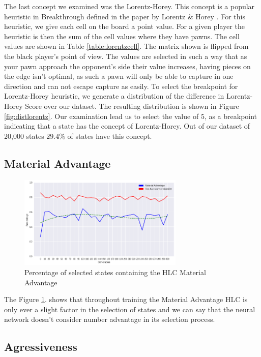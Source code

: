 The last concept we examined was the Lorentz-Horey. This concept is a popular heuristic in Breakthrough defined in the paper by Lorentz \& Horey \cite{lorentz:heuristic}. For this heuristic, we give each cell on the board a point value. For a given player the heuristic is then the sum of the cell values where they have pawns. The cell values are shown in Table \ref{table:lorentzcell}. The matrix shown is flipped from the black player's point of view. The values are selected in such a way that as your pawn approach the opponent's side their value increases, having pieces on the edge isn't optimal, as such a pawn will only be able to capture in one direction and can not escape capture as easily. To select the breakpoint for Lorentz-Horey heuristic, we generate a distribution of the difference in Lorentz-Horey Score over our dataset. The resulting distribution is shown in Figure \ref{fig:distlorentz}. Our examination lead us to select the value of $5$, as a breakpoint indicating that a state has the concept of Lorentz-Horey. Out of our dataset of 20,000 states $29.4\%$ of states have this concept.

\subsection{Material Advantage}

\begin{figure}[]
    \centering
    \includegraphics[width=0.7\textwidth]{graphics/number_pawns_trend}
    \caption{Percentage of selected states containing the HLC Material Advantage}
    \label{fig:numberadvantage}
\end{figure}

The Figure \ref{fig:numberadvantage}. shows that throughout training the Material Advantage HLC is only ever a slight factor in the selection of states and we can say that the neural network doesn't consider number advantage in its selection process.

\subsection{Agressiveness}


